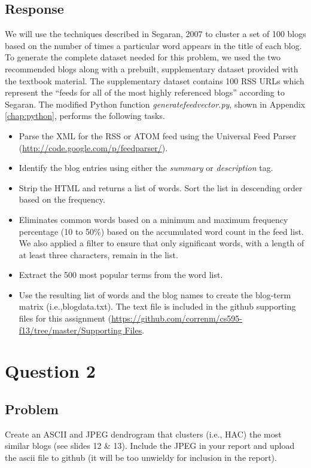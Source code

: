 \documentclass[letterpaper,11pt]{report}
\begin{document}
\begin{savenotes}
\subsection{Response}We will use the techniques described in Segaran, 2007 \cite{segaran2007programming} to cluster a set of 100 blogs based on the number of times a particular word appears in the title of each blog. To generate the complete dataset needed for this problem, we used the two recommended blogs along with a prebuilt, supplementary dataset provided with the textbook material. The supplementary dataset contains 100 RSS URLs which represent the ``feeds for all of the most highly referenced blogs'' according to Segaran. The modified Python function \emph{generatefeedvector.py}, shown in Appendix \ref{chap:python}, performs the following tasks.
\begin{itemize}
\item Parse the XML for the RSS or ATOM feed using the Universal Feed Parser (\url{http://code.google.com/p/feedparser/}).
\item Identify the blog entries using either the \emph{summary} or \emph{description} tag.
\item Strip the HTML and returns a list of words. Sort the list in descending order based on the frequency.
\item Eliminates common words based on a minimum and maximum frequency percentage (10 to 50\%) based on the accumulated word count in the feed list. We also applied a filter to ensure that only significant words, with a length of at least three characters, remain in the list.
\item Extract the 500 most popular terms from the word list.
\item Use the resulting list of words and the blog names to create the blog-term matrix (i.e.,blogdata.txt). The text file is included in the github supporting files for this assignment (\url{https://github.com/correnm/cs595-f13/tree/master/Supporting Files}.
\end{itemize}

\section{Question 2}
\subsection{Problem}Create an ASCII and JPEG dendrogram that clusters (i.e., HAC) the most similar blogs (see slides 12 \& 13).  Include the JPEG in your report and upload the ascii file to github (it will be too unwieldy for inclusion in the report).


\end{savenotes}
\end{document}
